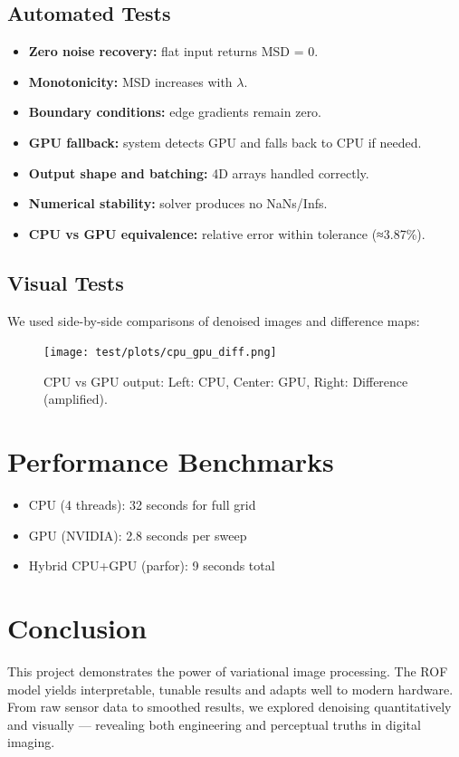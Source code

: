 \documentclass[11pt]{article}
\begin{document}
\subsection*{Automated Tests}
\begin{itemize}
  \item \textbf{Zero noise recovery:} flat input returns MSD = 0.
  \item \textbf{Monotonicity:} MSD increases with \(\lambda\).
  \item \textbf{Boundary conditions:} edge gradients remain zero.
  \item \textbf{GPU fallback:} system detects GPU and falls back to CPU if needed.
  \item \textbf{Output shape and batching:} 4D arrays handled correctly.
  \item \textbf{Numerical stability:} solver produces no NaNs/Infs.
  \item \textbf{CPU vs GPU equivalence:} relative error within tolerance (≈3.87\%).
\end{itemize}

\subsection*{Visual Tests}
We used side-by-side comparisons of denoised images and difference maps:

\begin{figure}[h]
    \centering
    \texttt{[image: test/plots/cpu\_gpu\_diff.png]}
    \caption{CPU vs GPU output: Left: CPU, Center: GPU, Right: Difference (amplified).}
\end{figure}

\section*{Performance Benchmarks}
\begin{itemize}
  \item CPU (4 threads): 32 seconds for full grid
  \item GPU (NVIDIA): 2.8 seconds per sweep
  \item Hybrid CPU+GPU (parfor): 9 seconds total
\end{itemize}

\section*{Conclusion}
This project demonstrates the power of variational image processing. The ROF model yields interpretable, tunable results and adapts well to modern hardware. From raw sensor data to smoothed results, we explored denoising quantitatively and visually — revealing both engineering and perceptual truths in digital imaging.
\end{document}
